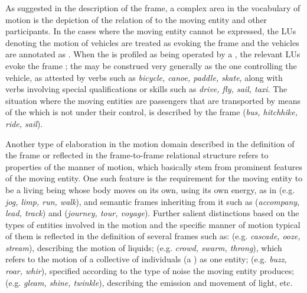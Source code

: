 \documentclass[output=paper,colorlinks,citecolor=brown]{langscibook}
\begin{document}

As suggested in the description of the  frame, a complex area in the vocabulary of motion is the depiction of the relation of  to the moving entity and other participants. In the cases where the moving entity cannot be expressed, the LUs denoting the motion of vehicles are treated as evoking the  frame and the vehicles are annotated as . When the  is profiled as being operated by a , the relevant LUs evoke the frame ; the  may be construed very generally as the one controlling the vehicle, as attested by verbs such as \textit{bicycle, canoe, paddle, skate}, along with verbs involving special qualifications or skills such as \textit{drive, fly, sail, taxi}. The situation where the moving entities are passengers that are transported by means of the  which is not under their control, is described by the  frame (\textit{bus, hitchhike, ride, sail}).

Another type of elaboration in the motion domain described in the definition of the frame or reflected in the frame-to-frame relational structure refers to properties of the manner of motion, which basically stem from prominent features of the moving entity. One such feature is the requirement for the moving entity to be a living being whose body moves on its own, using its own energy, as in  (e.g. \textit{jog, limp, run, walk}), and semantic frames inheriting from it such as  (\textit{accompany, lead, track}) and  (\textit{journey, tour, voyage}). Further salient distinctions based on the types of entities involved in the motion and the specific manner of motion typical of them is reflected in the definition of several frames such as:  (e.g. \textit{cascade, ooze, stream}), describing the motion of liquids;  (e.g. \textit{crowd, swarm, throng}), which refers to the motion of a collective of individuals (a ) as one entity;  (e.g. \textit{buzz, roar, whir}), specified according to the type of noise the moving entity produces;  (e.g. \textit{gleam, shine, twinkle}), describing the emission and movement of light, etc. 
\end{document}
